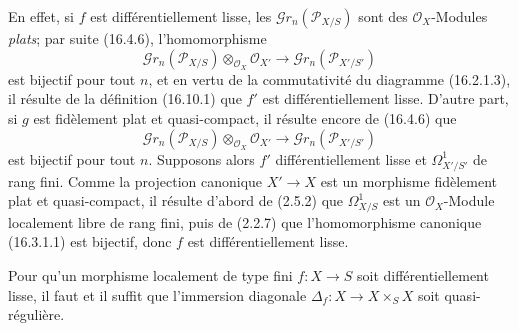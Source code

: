 En effet, si $f$ est différentiellement lisse, les
$\mathscr{G}r_n(\mathscr{P}_{X/S})$ sont des $\mathcal{O}_X$-Modules
\emph{plats}; par suite (16.4.6), l'homomorphisme
\[
  \mathscr{G}r_n(\mathscr{P}_{X/S})\otimes_{\mathcal{O}_X}\mathcal{O}_{X'}
  \longrightarrow\mathscr{G}r_n(\mathscr{P}_{X'/S'})
\]
est bijectif pour tout $n$, et en vertu de la commutativité du diagramme
(16.2.1.3), il résulte de la définition (16.10.1) que $f'$ est
différentiellement lisse. D'autre part, si $g$ est fidèlement plat et
quasi-compact, il résulte encore de (16.4.6) que
\[
  \mathscr{G}r_n(\mathscr{P}_{X/S})\otimes_{\mathcal{O}_X}\mathcal{O}_{X'}
  \longrightarrow\mathscr{G}r_n(\mathscr{P}_{X'/S'})
\]
est bijectif pour tout $n$. Supposons alors $f'$ différentiellement lisse et
$\Omega_{X'/S'}^1$ de rang fini. Comme la projection canonique $X'\to X$ est
un morphisme fidèlement plat et quasi-compact, il résulte d'abord de (2.5.2)
que $\Omega_{X/S}^1$ est un $\mathcal{O}_X$-Module localement libre de rang
fini, puis de (2.2.7) que l'homomorphisme canonique (16.3.1.1) est bijectif,
donc $f$ est différentiellement lisse.

\begin{proposition}[16.10.5]
\label{IV.16.10.5}
Pour qu'un morphisme localement de type fini $f:X\to S$ soit
différentiellement lisse, il faut et il suffit que l'immersion diagonale
$\Delta_f:X\to X\times_S X$ soit quasi-régulière.
\end{proposition}

